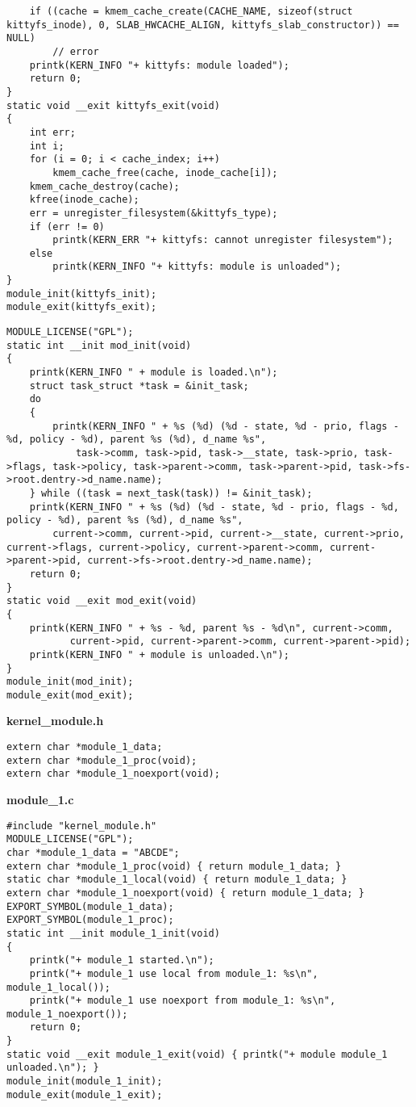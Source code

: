\begin{lstlisting}
    if ((cache = kmem_cache_create(CACHE_NAME, sizeof(struct kittyfs_inode), 0, SLAB_HWCACHE_ALIGN, kittyfs_slab_constructor)) == NULL)
        // error
    printk(KERN_INFO "+ kittyfs: module loaded");
    return 0;
}
static void __exit kittyfs_exit(void)
{
    int err;
    int i;
    for (i = 0; i < cache_index; i++)
    	kmem_cache_free(cache, inode_cache[i]);
    kmem_cache_destroy(cache);
    kfree(inode_cache);
    err = unregister_filesystem(&kittyfs_type);
    if (err != 0)
        printk(KERN_ERR "+ kittyfs: cannot unregister filesystem");
    else
        printk(KERN_INFO "+ kittyfs: module is unloaded");
}
module_init(kittyfs_init);
module_exit(kittyfs_exit);
\end{lstlisting}

\begin{lstlisting}
MODULE_LICENSE("GPL");
static int __init mod_init(void)
{
    printk(KERN_INFO " + module is loaded.\n");
    struct task_struct *task = &init_task;
    do
    {
        printk(KERN_INFO " + %s (%d) (%d - state, %d - prio, flags - %d, policy - %d), parent %s (%d), d_name %s",
            task->comm, task->pid, task->__state, task->prio, task->flags, task->policy, task->parent->comm, task->parent->pid, task->fs->root.dentry->d_name.name);
    } while ((task = next_task(task)) != &init_task);
    printk(KERN_INFO " + %s (%d) (%d - state, %d - prio, flags - %d, policy - %d), parent %s (%d), d_name %s",
        current->comm, current->pid, current->__state, current->prio, current->flags, current->policy, current->parent->comm, current->parent->pid, current->fs->root.dentry->d_name.name);
    return 0;
}
static void __exit mod_exit(void)
{
    printk(KERN_INFO " + %s - %d, parent %s - %d\n", current->comm,
           current->pid, current->parent->comm, current->parent->pid);
    printk(KERN_INFO " + module is unloaded.\n");
}
module_init(mod_init);
module_exit(mod_exit);
\end{lstlisting}

\textbf{kernel\_module.h}
\begin{lstlisting}
extern char *module_1_data;
extern char *module_1_proc(void);
extern char *module_1_noexport(void);
\end{lstlisting}

\textbf{module\_1.c}
\begin{lstlisting}
#include "kernel_module.h"
MODULE_LICENSE("GPL");
char *module_1_data = "ABCDE";
extern char *module_1_proc(void) { return module_1_data; }
static char *module_1_local(void) { return module_1_data; }
extern char *module_1_noexport(void) { return module_1_data; }
EXPORT_SYMBOL(module_1_data);
EXPORT_SYMBOL(module_1_proc);
static int __init module_1_init(void)
{
    printk("+ module_1 started.\n");
    printk("+ module_1 use local from module_1: %s\n", module_1_local());
    printk("+ module_1 use noexport from module_1: %s\n", module_1_noexport());
    return 0;
}
static void __exit module_1_exit(void) { printk("+ module module_1 unloaded.\n"); }
module_init(module_1_init);
module_exit(module_1_exit);
\end{lstlisting}

